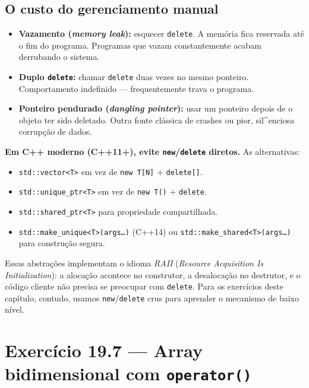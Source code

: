 \documentclass[11pt,a4paper]{article}
\begin{document}
\subsection*{O custo do gerenciamento manual}

\begin{itemize}[leftmargin=*]
  \item \textbf{Vazamento (\emph{memory leak}):} esquecer \texttt{delete}. A mem\'oria fica reservada at\'e o fim do programa. Programas que vazam constantemente acabam derrubando o sistema.
  \item \textbf{Duplo \texttt{delete}:} chamar \texttt{delete} duas vezes no mesmo ponteiro. Comportamento indefinido --- frequentemente trava o programa.
  \item \textbf{Ponteiro pendurado (\emph{dangling pointer}):} usar um ponteiro depois de o objeto ter sido deletado. Outra fonte cl\'assica de crashes ou pior, sil^enciosa corrup\c{c}\~ao de dados.
\end{itemize}

\begin{boaprat}
\textbf{Em C++ moderno (C++11+), evite \texttt{new}/\texttt{delete} diretos.} As alternativas:

\begin{itemize}[leftmargin=*,itemsep=0pt]
  \item \texttt{std::vector<T>} em vez de \texttt{new T[N]} + \texttt{delete[]}.
  \item \texttt{std::unique\_ptr<T>} em vez de \texttt{new T()} + \texttt{delete}.
  \item \texttt{std::shared\_ptr<T>} para propriedade compartilhada.
  \item \texttt{std::make\_unique<T>(args\ldots)} (C++14) ou \texttt{std::make\_shared<T>(args\ldots)} para constru\c{c}\~ao segura.
\end{itemize}

Essas abstra\c{c}\~oes implementam o idioma \emph{RAII} (\emph{Resource Acquisition Is Initialization}): a aloca\c{c}\~ao acontece no construtor, a desaloca\c{c}\~ao no destrutor, e o c\'odigo cliente n\~ao precisa se preocupar com \texttt{delete}. Para os exerc\'icios deste cap\'itulo, contudo, usamos \texttt{new}/\texttt{delete} crus para aprender o mecanismo de baixo n\'ivel.
\end{boaprat}

\newpage
\section{Exerc\'icio 19.7 --- Array bidimensional com \texttt{operator()}}
\end{document}
